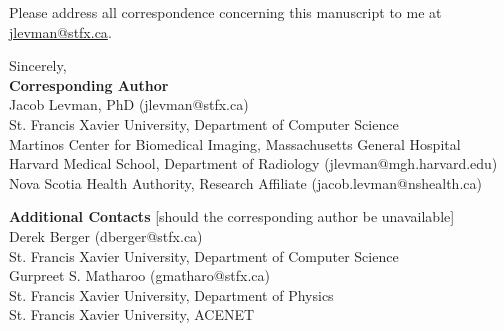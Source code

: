 \documentclass[10pt,letter]{article}
\begin{document}
Please address all correspondence concerning this manuscript to me at \href{jlevman@stfx.ca}{jlevman@stfx.ca}.







\bigskip

\noindent
Sincerely, \\

\small
\noindent
\textbf{Corresponding Author}\\
Jacob Levman, PhD (jlevman@stfx.ca) \\
\footnotesize
\hspace*{0.25cm}St. Francis Xavier University, Department of Computer Science  \\
\hspace*{0.25cm}Martinos Center for Biomedical Imaging, Massachusetts General Hospital \\
\hspace*{0.25cm}Harvard Medical School, Department of Radiology (jlevman@mgh.harvard.edu) \\
\hspace*{0.25cm}Nova Scotia Health Authority, Research Affiliate (jacob.levman@nshealth.ca) \\
\normalsize

\small
\noindent
\textbf{Additional Contacts} [should the corresponding author be unavailable]\\
Derek Berger (dberger@stfx.ca)\\
\footnotesize
\hspace*{0.25cm} St. Francis Xavier University, Department of Computer Science \\
\small
Gurpreet S. Matharoo (gmatharo@stfx.ca) \\
\footnotesize
\hspace*{0.25cm} St. Francis Xavier University, Department of Physics \\
\hspace*{0.25cm} St. Francis Xavier University, ACENET
\normalsize





\end{document}
